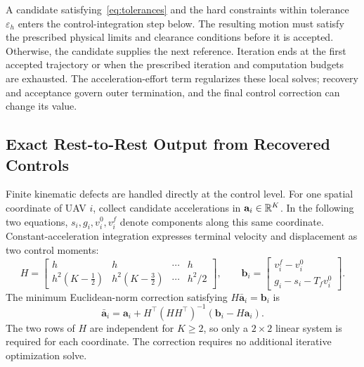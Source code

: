 A candidate satisfying~\eqref{eq:tolerances} and the hard constraints within tolerance $\varepsilon_h$ enters the control-integration step below. The resulting motion must satisfy the prescribed physical limits and clearance conditions before it is accepted. Otherwise, the candidate supplies the next reference. Iteration ends at the first accepted trajectory or when the prescribed iteration and computation budgets are exhausted. The acceleration-effort term regularizes these local solves; recovery and acceptance govern outer termination, and the final control correction can change its value.

\subsection{Exact Rest-to-Rest Output from Recovered Controls}
\label{sec:arcs}
Finite kinematic defects are handled directly at the control level. For one spatial coordinate of UAV $i$, collect candidate accelerations in $\mathbf a_i\in\mathbb{R}^K$. In the following two equations, $s_i,g_i,v_i^0,v_i^f$ denote components along this same coordinate. Constant-acceleration integration expresses terminal velocity and displacement as two control moments:
\begin{equation}
 H=
 \begin{bmatrix}
 h&h&\cdots&h\\
 h^2(K-\tfrac12)&h^2(K-\tfrac32)&\cdots&h^2/2
 \end{bmatrix},\qquad
 \mathbf b_i=\begin{bmatrix}v_i^f-v_i^0\\g_i-s_i-T_f v_i^0\end{bmatrix}.
 \label{eq:moments}
\end{equation}
The minimum Euclidean-norm correction satisfying $H\bar{\mathbf a}_i=\mathbf b_i$ is
\begin{equation}
 \bar{\mathbf a}_i=\mathbf a_i+
 H^\top(HH^\top)^{-1}(\mathbf b_i-H\mathbf a_i).
 \label{eq:correction}
\end{equation}
The two rows of $H$ are independent for $K\geq2$, so only a $2\times2$ linear system is required for each coordinate. The correction requires no additional iterative optimization solve.

